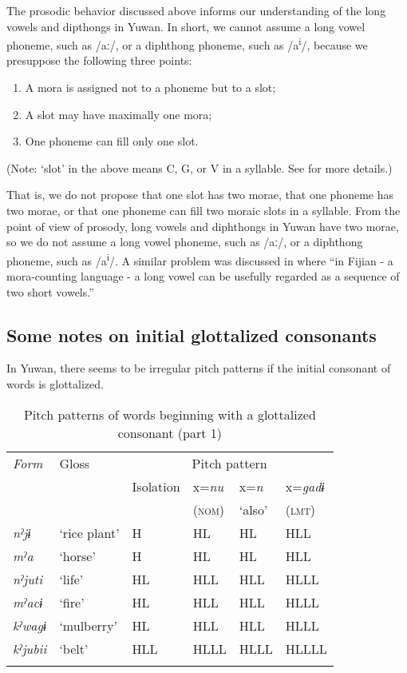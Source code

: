 The prosodic behavior discussed above informs our understanding of the long vowels and dipthongs in Yuwan. In short, we cannot assume a long vowel phoneme, such as /aː/, or a diphthong phoneme, such as /a\textsuperscript{i}/, because we presuppose the following three points:

\begin{enumerate}[label=\alph*.]
\item A mora is assigned not to a phoneme but to a slot;
\item A slot may have maximally one mora;
\item One phoneme can fill only one slot.
\end{enumerate}

(Note: ‘slot’ in the above means C, G, or V in a syllable. See  for more details.)

That is, we do not propose that one slot has two morae, that one phoneme has two morae, or that one phoneme can fill two moraic slots in a syllable. From the point of view of prosody, long vowels and diphthongs in Yuwan have two morae, so we do not assume a long vowel phoneme, such as /aː/, or a diphthong phoneme, such as /a\textsuperscript{i}/. A similar problem was discussed in \citet[196-199]{Dixon2010} where “in Fijian - a mora-counting language - a long vowel can be usefully regarded as a sequence of two short vowels.”

\subsection{Some notes on initial glottalized consonants}
\label{bkm:Ref347180628}\hypertarget{RefHeadingToc395696985}{}
In Yuwan, there seems to be irregular pitch patterns if the initial consonant of words is glottalized.

\begin{table}
\caption{Pitch patterns of words beginning with a glottalized consonant (part 1)}
\begin{tabular}{>{\itshape}llllll}
\lsptoprule
\normalfont Form & Gloss & \multicolumn{4}{c}{Pitch pattern}\\\cmidrule(lr){3-6}
     &       & Isolation & x=\textit{nu} & x=\textit{n} & x=\textit{gadɨ}\\
     &       &           & (\textsc{nom}) & ‘also’ & (\textsc{lmt})\\\midrule
nˀjɨ    &  ‘rice plant’ &  H   & HL   & HL   &  HLL\\
mˀa     &  ‘horse’       &  H   & HL   & HL   &  HLL\\
nˀjuti  &  ‘life’     &  HL  & HLL  & HLL  &  HLLL\\
mˀacɨ   &  ‘fire’      &  HL  & HLL  & HLL  &  HLLL\\
kˀwagɨ  &  ‘mulberry’ &  HL  & HLL  & HLL  &  HLLL\\
kˀjubii &  ‘belt’    &  HLL & HLLL & HLLL &  HLLLL\\
\lspbottomrule
\end{tabular}
\end{table}

